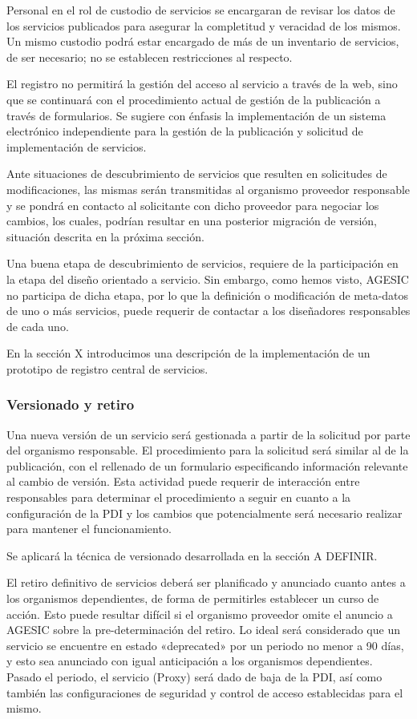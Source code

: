 \documentclass[11pt]{article}
\begin{document}
				Personal en el rol de custodio de servicios se encargaran de revisar los datos de los servicios publicados para asegurar la completitud y veracidad de los mismos. Un mismo custodio podrá estar encargado de más de un inventario de servicios, de ser necesario; no se establecen restricciones al respecto.

				El registro no permitirá la gestión del acceso al servicio a través de la web, sino que se continuará con el procedimiento actual de gestión de la publicación a través de formularios. Se sugiere con énfasis la implementación de un sistema electrónico independiente para la gestión de la publicación y solicitud de implementación de servicios.

				Ante situaciones de descubrimiento de servicios que resulten en solicitudes de modificaciones, las mismas serán transmitidas al organismo proveedor responsable y se pondrá en contacto al solicitante con dicho proveedor para negociar los cambios, los cuales, podrían resultar en una posterior migración de versión, situación descrita en la próxima sección.

				Una buena etapa de descubrimiento de servicios, requiere de la participación en la etapa del diseño orientado a servicio. Sin embargo, como hemos visto, AGESIC no participa de dicha etapa, por lo que la definición o modificación de meta-datos de uno o más servicios, puede requerir de contactar a los diseñadores responsables de cada uno.

				En la sección X introducimos una descripción de la implementación de un prototipo de registro central de servicios.

			\subsubsection{Versionado y retiro}
				Una nueva versión de un servicio será gestionada a partir de la solicitud por parte del organismo responsable. El procedimiento para la solicitud será similar al de la publicación, con el rellenado de un formulario especificando información relevante al cambio de versión. Esta actividad puede requerir de interacción entre responsables para determinar el procedimiento a seguir en cuanto a la configuración de la PDI y los cambios que potencialmente será necesario realizar para mantener el funcionamiento.

				Se aplicará la técnica de versionado desarrollada en la sección A DEFINIR.

				El retiro definitivo de servicios deberá ser planificado y anunciado cuanto antes a los organismos dependientes, de forma de permitirles establecer un curso de acción. Esto puede resultar difícil si el organismo proveedor omite el anuncio a AGESIC sobre la pre-determinación del retiro. Lo ideal será considerado que un servicio se encuentre en estado «deprecated» por un periodo no menor a 90 días, y esto sea anunciado con igual anticipación a los organismos dependientes. Pasado el periodo, el servicio (Proxy) será dado de baja de la PDI, así como también las configuraciones de seguridad y control de acceso establecidas para el mismo.
\end{document}
